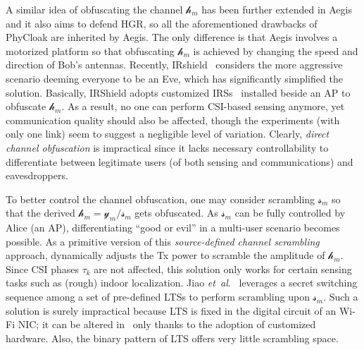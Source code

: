 \documentclass[conference,compsoc]{IEEEtran}
\newcommand{\rev}[1]{{\color{blue}#1}}      %
\newcommand{\newrev}[1]{{\color{blue}#1}}    %
\newcommand{\rev}[1]{#1}
\newcommand{\newrev}[1]{#1}
\begin{document}
A similar idea of obfuscating the channel \rev{$\mathcal{h}_{m}$} has been further extended in Aegis~\cite{Aegis-INFOCOM18} and it also aims to defend HGR, so all the aforementioned drawbacks of PhyCloak are inherited by Aegis. The only difference is that Aegis involves a motorized platform so that obfuscating \rev{$\mathcal{h}_{m}$} is achieved by changing the speed and direction of Bob's antennas. 
Recently, IRshield~\cite{IRShield-SP22} considers the more aggressive scenario deeming everyone to be an Eve, which has significantly simplified the solution.
Basically, IRShield adopts customized IRSs~\cite{IRS-LSA14} installed beside an AP to obfuscate \rev{$\mathcal{h}_{m}$}. As a result, no one 
can perform CSI-based sensing anymore, yet communication quality should also be affected, though the experiments (with only one link) seem to suggest a negligible level of variation. Clearly, \textit{direct channel obfuscation} is impractical since it lacks necessary controllability to differentiate between legitimate users (of both sensing and communications) and eavesdroppers.


To better control the channel obfuscation, one may consider scrambling \rev{$\mathcal{s}_{m}$} so that the derived \rev{$\mathcal{h}_{m} = \mathcal{y}_{m} / \mathcal{s}_{m}$} gets obfuscated. As \rev{$\mathcal{s}_{m}$} can be fully controlled by Alice (an AP), differentiating ``good or evil'' in a multi-user scenario becomes possible. As a primitive version of this \textit{source-defined channel scrambling} approach, \cite{EtTuAlexa-NDSS20} dynamically adjusts the Tx power to scramble the amplitude of \rev{$\mathcal{h}_{m}$}. 
Since CSI phases $\tau_k$ are not affected, this solution only works for certain sensing tasks such as (rough) indoor localization. Jiao \textit{et~al}.~\cite{openwifi-WiSec21} leverages a secret switching sequence among a set of pre-defined LTSs to perform scrambling upon \rev{$\mathcal{s}_{m}$}. 
%
\newrev{Such a solution is surely impractical because LTS is fixed in the digital circuit of an Wi-Fi NIC; it can be altered in~\cite{openwifi-WiSec21} only thanks to the adoption of customized hardware. Also, the binary pattern of LTS offers very little scrambling space.}
%
\end{document}

